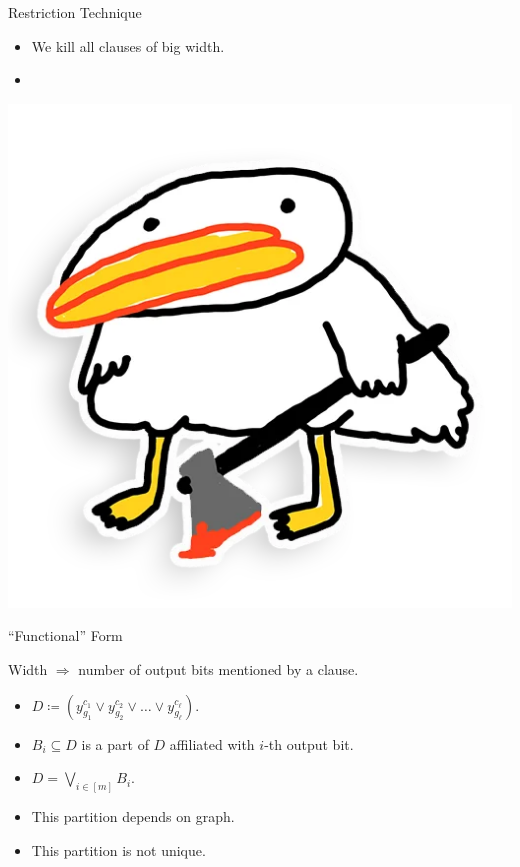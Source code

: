 \begin{frame}{Restriction Technique}
    \pause
    \vspace{0.3cm}
    \begin{minipage}{0.7\linewidth}
        \begin{itemize}
            \item We kill all clauses of big width.
            \item {}
        \end{itemize}        
    \end{minipage}
    \begin{minipage}{0.25\linewidth}
        \centering
        \includegraphics[scale = 0.1]{pics/utia-blood.png}
    \end{minipage}
\end{frame}

\begin{frame}{``Functional'' Form}

    
    Width $\Rightarrow$ number of output bits \alert{mentioned} by a clause.

    \begin{itemize}
        \item $D \coloneqq (y^{c_1}_{g_1} \lor y^{c_2}_{g_2} \lor \dots \lor y^{c_{\ell}}_{g_{\ell}})$.
            \pause
        \item $B_i \subseteq D$ is a part of $D$ affiliated with $i$-th output bit.
            \pause
        \item $D = \bigvee\limits_{i \in [m]} B_i$.
            \pause
        \item This partition depends on graph.
            \pause
        \item This partition is \alert{not} unique.
    \end{itemize}
\end{frame}


